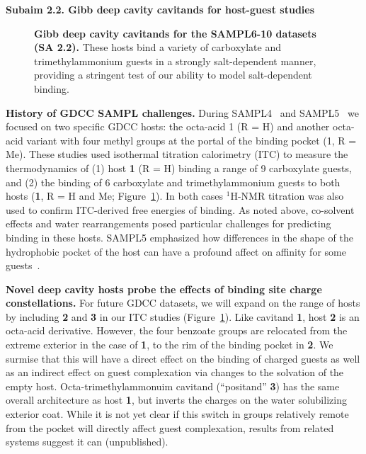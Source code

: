 \documentclass[11pt]{article}
\begin{document}
\textbf{Subaim 2.2. Gibb deep cavity cavitands for host-guest studies} 


\begin{figure}[h]
\begin{centering}

\end{centering}

\vspace{-0.1in}
\caption{\footnotesize {\bf Gibb deep cavity cavitands for the SAMPL6-10 datasets (SA 2.2).} These hosts bind a variety of carboxylate and trimethylammonium guests in a strongly salt-dependent manner, providing a stringent test of our ability to model salt-dependent binding.
\label{figure:gdccs}
\vspace{-0.2in}
}
\end{figure}

{\bf History of GDCC SAMPL challenges.} During SAMPL4~\cite{gibb_binding_2013} and SAMPL5~\cite{sullivan_binding_2016} we focused on two specific GDCC hosts: the octa-acid 1 (R = H) and another octa-acid variant with four methyl groups at the portal of the binding pocket (1, R = Me). 
These studies used isothermal titration calorimetry (ITC) to measure the thermodynamics of (1) host {\bf 1} (R = H) binding a range of 9 carboxylate guests,
and (2) the binding of 6 carboxylate and trimethylammonium guests to both hosts ({\bf 1}, R = H and Me; Figure~\ref{figure:gdccs}).  
In both cases $^1$H-NMR titration was also used to confirm ITC-derived free energies of binding.  
As noted above, co-solvent effects and water rearrangements posed particular challenges for predicting binding in these hosts. 
SAMPL5 emphasized how differences in the shape of the hydrophobic pocket of the host can have a profound affect on affinity for some guests~\cite{yin_overview_2016}.

{\bf Novel deep cavity hosts probe the effects of binding site charge constellations.} 
For future GDCC datasets, we will expand on the range of hosts by including {\bf 2} and {\bf 3} in our ITC studies (Figure~\ref{figure:gdccs}).  
Like cavitand {\bf 1}, host {\bf 2} is an octa-acid derivative.  However, the four benzoate groups are relocated from the extreme exterior in the case of {\bf 1}, to the rim of the binding pocket in {\bf 2}.  
We surmise that this will have a direct effect on the binding of charged guests as well as an indirect effect on guest complexation via changes to the solvation of the empty host.  
Octa-trimethylammonuim cavitand (``positand'' {\bf 3}) has the same overall architecture as host {\bf 1}, but inverts the charges on the water solubilizing exterior coat.  
While it is not yet clear if this switch in groups relatively remote from the pocket will directly affect guest complexation, results from related systems suggest it can (unpublished). 
\end{document}
